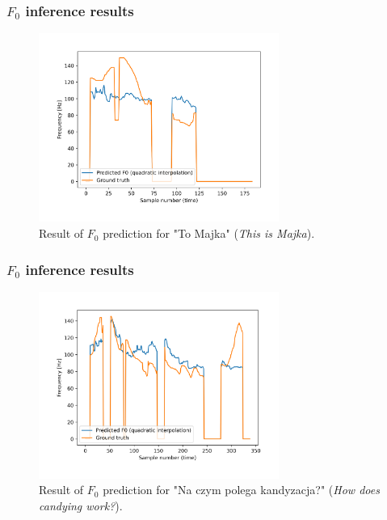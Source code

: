 \documentclass[a4paper,9pt]{beamer}
\theoremstyle{mytheoremstyle}
\begin{document}
\begin{frame}
\frametitle{$F_{0}$ inference results}
\begin{figure}
\begin{center}
  \includegraphics[width=0.7\textwidth]{res/amu_pl_ilo_BAZA_2006D_D1140_simple_pred_freq}
\end{center}
	\caption{Result of $F_0$ prediction for "To Majka" (\textit{This is Majka}).}
\end{figure}
\end{frame}

\begin{frame}
\frametitle{$F_{0}$ inference results}
\begin{figure}
\begin{center}
  \includegraphics[width=0.7\textwidth]{res/amu_pl_ilo_BAZA_2006C_C0208_simple_pred_freq}
\end{center}
	\caption{Result of $F_0$ prediction for "Na czym polega kandyzacja?" (\textit{How does candying work?}).}
\end{figure}
\end{frame}

\end{document}
